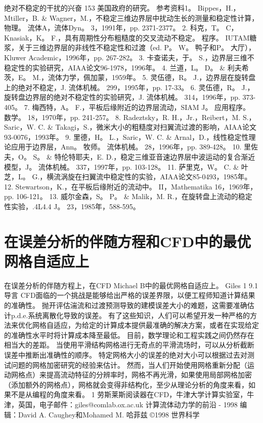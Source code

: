 \documentclass[UTF8,11pt,a4paper,openany,fontset=fandol]{ctexbook}
\begin{document}
绝对不稳定的干扰的兴奋 153 美国政府的研究。 参考资料1。 Bippes，H.，Mtiller，B. \& Wagner，M.，不稳定三维边界层中扰动生长的测量和稳定性计算，物理。 流体A，流体Dyn。 3，1991年，pp. 2371-2377。 2. 科克，T。 C，Knasiak，K。 F.，具有周期性分布粗糙度的交叉流动不稳定。 程序。 IUTAM糖浆，关于三维边界层的非线性不稳定性和过渡（ed. P。 W。 鸭子和P。 大厅），Kluwer Academic，1996年，pp. 267-282。 3. 卡查诺夫，于。 S.，边界层三维不稳定性的实验研究，AIAA论文96-1978，1996年。 4. 兰道，L。 D。 \& 利夫希茨，E。 M.，流体力学，佩加蒙，1959年。 5. 灵伍德，R。 J.，边界层在旋转盘上的绝对不稳定，J. 流体机械。 299，1995年，pp. 17-33。 6. 灵伍德，R。 J.，旋转盘边界层的绝对不稳定性的实验研究，J. 流体机械。 314，1996年，pp. 373-405。 7. 梅西特，A。 F.，平板后缘附近的边界层流动，SIAM J。 应用程序。 数学。 18，1970年，pp. 241-257。 8. Radeztsky，R. H.，Jr.，Reibert，M. S.，Saric，W. C. \& Takagi，S.，微米大小的粗糙度对扫翼流过渡的影响，AIAA论文93-0076，1993年。 9. 里德，H。 L.，Saric，W. C. \& Arnal，D.，线性稳定性理论应用于边界层，Ann。 牧师。 流体机械。 28，1996年，pp. 389-428。 10. 里佐夫，O。 S。 \& 特伦特耶夫，E. D.，稳定三维亚音速边界层中波运动的复合渐近模型，J。 流体机械。 337，1997年，pp. 103-128。 11. 萨里克，W。 C. \& 叶芝，L。 G.，横流涡旋在扫翼流中稳定性的实验，AIAA论文85-0493，1985年。 12. Stewartson，K.，在平板后缘附近的流动中。 II，Mathematika 16，1969年，pp. 106-121。 13. 威尔金森，S。 P。 \& Malik，M. R.，在旋转盘上流动的稳定性实验，.4L4.4 J。 23，1985年，588-595。

\clearpage
\chapter{在误差分析的伴随方程和CFD中的最优网格自适应上}
在误差分析的伴随方程上，在CFD Michael B中的最优网格自适应上。 Giles 1 9.1 导言 CFD面临的一个挑战是能够给出严格的误差界限，以便工程师知道计算结果的准确性。 抛开评估湍流和过渡预测导致的建模误差大小的难题，这需要准确估计p.d.e.系统离散化导致的误差。 有了这些知识，人们可以希望开发一种严格的方法来优化网格自适应，为给定的计算成本提供最准确的解决方案，或者在实现给定的准确性水平时将计算成本降至最低。 目前，数学理论和工程实践之间仍然存在相当大的差距。 当使用平滑结构网格进行无奇点的平滑流场时，可以从分析截断误差中推断出准确性的顺序。 特定网格大小的误差的绝对大小可以根据过去对测试问题的网格加密研究的经验来估计。 然而，当人们开始使用网格重新分配（运动网格点）来提高流动特征的分辨率时，网格不再光滑，如果使用局部网格加密（添加额外的网格点），网格就会变得非结构化，至少从理论分析的角度来看，如果不是从编程的角度来看。 1 劳斯莱斯阅读器在CFD，牛津大学计算实验室，牛津，英国，电子邮件：giles@comlab.ox.ac.uk 计算流体动力学的前沿 - 1998 编辑：David A. Caughey和Mohamed M. 哈菲兹 ©1998 世界科学
\end{document}
